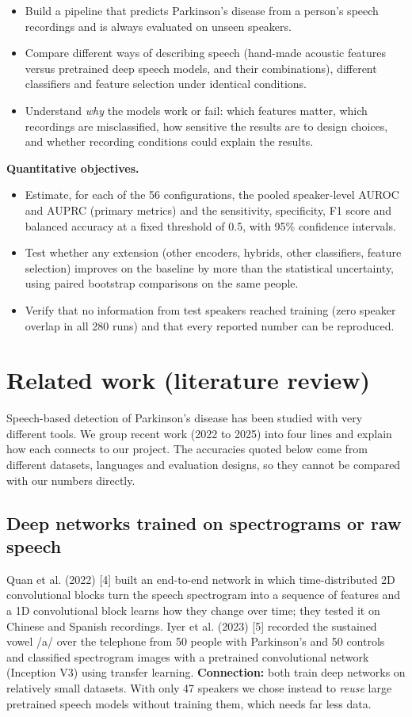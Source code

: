 \documentclass[11pt,a4paper]{article}
\begin{document}
\begin{itemize}\item Build a pipeline that predicts Parkinson's disease from a person's speech recordings and is always evaluated on unseen speakers.
\item Compare different ways of describing speech (hand-made acoustic features versus pretrained deep speech models, and their combinations), different classifiers and feature selection under identical conditions.
\item Understand \emph{why} the models work or fail: which features matter, which recordings are misclassified, how sensitive the results are to design choices, and whether recording conditions could explain the results.
\end{itemize}
\textbf{Quantitative objectives.}

\begin{itemize}\item Estimate, for each of the 56 configurations, the pooled speaker-level AUROC and AUPRC (primary metrics) and the sensitivity, specificity, F1 score and balanced accuracy at a fixed threshold of 0.5, with 95\% confidence intervals.
\item Test whether any extension (other encoders, hybrids, other classifiers, feature selection) improves on the baseline by more than the statistical uncertainty, using paired bootstrap comparisons on the same people.
\item Verify that no information from test speakers reached training (zero speaker overlap in all 280 runs) and that every reported number can be reproduced.
\end{itemize}
\section{Related work (literature review)}\label{sec:related}
Speech-based detection of Parkinson's disease has been studied with very different tools. We group recent work (2022 to 2025) into four lines and explain how each connects to our project. The accuracies quoted below come from different datasets, languages and evaluation designs, so they cannot be compared with our numbers directly.

\subsection{Deep networks trained on spectrograms or raw speech}
Quan et al. (2022) [4] built an end-to-end network in which time-distributed 2D convolutional blocks turn the speech spectrogram into a sequence of features and a 1D convolutional block learns how they change over time; they tested it on Chinese and Spanish recordings. Iyer et al. (2023) [5] recorded the sustained vowel /a/ over the telephone from 50 people with Parkinson's and 50 controls and classified spectrogram images with a pretrained convolutional network (Inception V3) using transfer learning. \textbf{Connection:} both train deep networks on relatively small datasets. With only 47 speakers we chose instead to \emph{reuse} large pretrained speech models without training them, which needs far less data.
\end{document}
